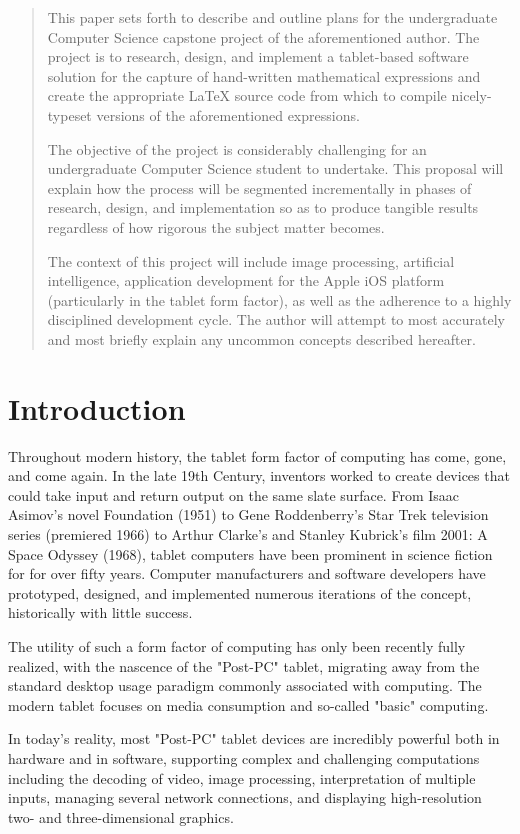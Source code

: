 \documentclass{acm_proc_article-sp}
\begin{document}
\begin{abstract}
This paper sets forth to describe and outline plans for the undergraduate Computer Science capstone project of the aforementioned author. The project is to research, design, and implement a tablet-based software solution for the capture of hand-written mathematical expressions and create the appropriate LaTeX source code from which to compile nicely-typeset versions of the aforementioned expressions.

The objective of the project is considerably challenging for an undergraduate Computer Science student to undertake. This proposal will explain how the process will be segmented incrementally in phases of research, design, and implementation so as to produce tangible results regardless of how rigorous the subject matter becomes.

The context of this project will include image processing, artificial intelligence, application development for the Apple iOS platform (particularly in the tablet form factor), as well as the adherence to a highly disciplined development cycle. The author will attempt to most accurately and most briefly explain any uncommon concepts described hereafter.
\end{abstract}

\section{Introduction}
Throughout modern history, the tablet form factor of computing has come, gone, and come again. In the late 19th Century, inventors worked to create devices that could take input and return output on the same slate surface. From Isaac Asimov's novel Foundation (1951) to Gene Roddenberry's Star Trek television series (premiered 1966) to Arthur Clarke's and Stanley Kubrick's film 2001: A Space Odyssey (1968), tablet computers have been prominent in science fiction for for over fifty years. Computer manufacturers and software developers have prototyped, designed, and implemented numerous iterations of the concept, historically with little success.

The utility of such a form factor of computing has only been recently fully realized, with the nascence of the "Post-PC" tablet, migrating away from the standard desktop usage paradigm commonly associated with computing. The modern tablet focuses on media consumption and so-called "basic" computing. 

In today's reality, most "Post-PC" tablet devices are incredibly powerful both in hardware and in software, supporting complex and challenging computations including the decoding of video, image processing, interpretation of multiple inputs, managing several network connections, and displaying high-resolution two- and three-dimensional graphics.
\end{document}
